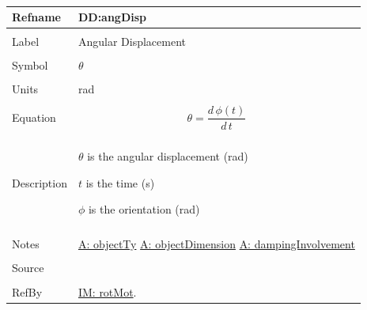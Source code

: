 \documentclass[12pt]{article}
\begin{document}
~\newline
 \noindent \begin{minipage}{\textwidth}
\begin{tabular}{p{} p{}}
\toprule \textbf{Refname} & \textbf{DD:angDisp}
\label{DD:angDisp}
\\ \midrule \\
Label & Angular Displacement
        \\ \midrule \\
        Symbol & $θ$
                 \\ \midrule \\
                 Units & rad
                         \\ \midrule \\
                         Equation & \begin{displaymath}
                                    θ=\frac{d\,ϕ\left(t\right)}{d\,t}
                                    \end{displaymath}
                                    \\ \midrule \\
                                    Description & \begin{symbDescription}
                                                  \item{$θ$ is the angular displacement (rad)}
                                                  \item{$t$ is the time (s)}
                                                  \item{$ϕ$ is the orientation (rad)}
                                                  \end{symbDescription}
                                                  \\ \midrule \\
                                                  Notes & \hyperref[A:objectTy]{A: objectTy}
                                                          \hyperref[A:objectDimension]{A: objectDimension}
                                                          \hyperref[A:dampingInvolvement]{A: dampingInvolvement}
                                                          \\ \midrule \\
                                                          Source & \\ \midrule \\
                                                                   RefBy & \hyperref[IM:rotMot]{IM: rotMot}.
\\ \bottomrule \end{tabular}
\end{minipage}\\
\end{document}
